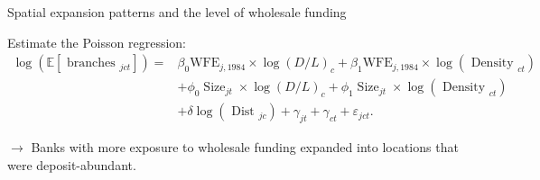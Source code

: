 \documentclass[notes,10pt, aspectratio=169]{beamer}
\newenvironment{wideitemize}{\itemize\addtolength{\itemsep}{10pt}}{\enditemize}
\begin{document}
    
    
        \begin{frame}{Spatial expansion patterns and the level of wholesale funding         \hyperlink{mismatch_sorting}{}}\label{mismatch_sorting3}
    
        \begin{wideitemize}
            \item
     Estimate the Poisson regression:
            $$
            \begin{aligned}
            \log \left(\mathbb{E}\left[\text { branches }_{j c t}\right]\right)= & \beta_0 \mathrm{WFE}_{j, 1984} \times \log (D / L)_c+\beta_1 \mathrm{WFE}_{j, 1984} \times \log \left(\text { Density }_{c t}\right) \\
            & +\phi_0 \operatorname{Size}_{j t} \times \log (D / L)_c+\phi_1 \operatorname{Size}_{j t} \times \log \left(\text { Density }_{c t}\right) \\
            & +\delta \log \left(\text { Dist }_{j c}\right)+\gamma_{j t}+\gamma_{c t}+\varepsilon_{j c t} .
            \end{aligned}
            $$
            
    
            \item[$\rightarrow$] Banks with more exposure to wholesale funding expanded into locations that were deposit-abundant. %
        \end{wideitemize}
            
    
        
        \end{frame}
    
    
    
\end{document}
